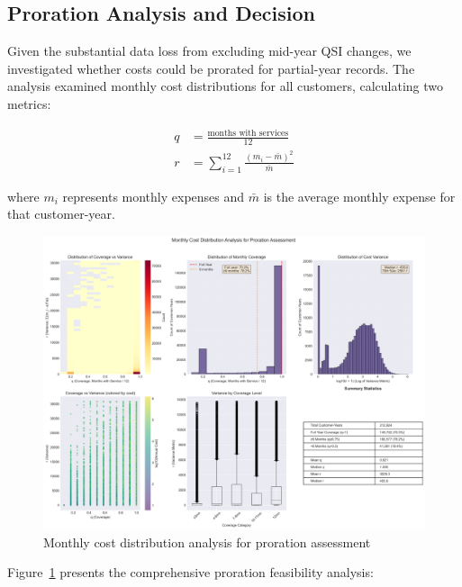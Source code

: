 \subsection{Proration Analysis and Decision}

Given the substantial data loss from excluding mid-year QSI changes, we investigated whether costs could be prorated for partial-year records. The analysis examined monthly cost distributions for all customers, calculating two metrics:

\begin{align}
q &= \frac{\text{months with services}}{12} \\
r &= \sum_{i=1}^{12} \frac{(m_i - \bar{m})^2}{\bar{m}}
\end{align}

where $m_i$ represents monthly expenses and $\bar{m}$ is the average monthly expense for that customer-year.

\begin{figure}[h]
    \centering
    \includegraphics[width=\textwidth]{figures/cost_distribution_analysis.png}
    \caption{Monthly cost distribution analysis for proration assessment}
    \label{fig:proration_analysis}
\end{figure}

Figure~\ref{fig:proration_analysis} presents the comprehensive proration feasibility analysis:

